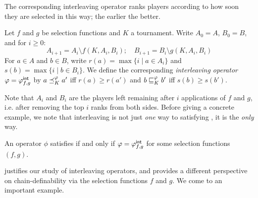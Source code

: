 The corresponding interleaving operator ranks players according to how soon
they are selected in this way; the earlier the better.

\begin{definition}%
    \label{tourn_def_interleaving}

    Let $f$ and $g$ be selection functions and $K$ a tournament. Write $A_0
    = A$, $B_0 = B$, and for $i \ge 0$:
    \[
        A_{i+1} = A_i \setminus f(K, A_i, B_i);
        \quad
        B_{i+1} = B_i \setminus g(K, A_i, B_i)
    \]
    For $a \in A$ and $b \in B$, write $r(a) = \max{\{ i \mid a \in A_i \}}$
    and $s(b) = \max{\{ i \mid b \in B_i \}}$.\footnotemark{} We define the
    corresponding \emph{interleaving operator} $\varphi = {\varphi_{f,g}^\mathsf{int}}$ by $a
    \preceq_K^\varphi a'$ iff $r(a) \ge r(a')$ and $b \sqsubseteq_K^\varphi b'$ iff $s(b) \ge
    s(b')$.


\end{definition}

Note that $A_i$ and $B_i$ are the players left remaining after $i$ applications
of $f$ and $g$, i.e. after removing the top $i$ ranks from both sides. Before
giving a concrete example, we note that interleaving is not just \emph{one} way
to satisfying , it is the \emph{only} way.

\begin{theorem}
   \label{tourn_result_chaindef_iff_interleaving}

    An operator $\phi$ satisfies  if and only if $\varphi =
    {\varphi_{f,g}^\mathsf{int}}$ for some selection functions $(f, g)$.

\end{theorem}

 justifies our study of interleaving
operators, and provides a different perspective on chain-definability via the
selection functions $f$ and $g$. We come to an important example.

